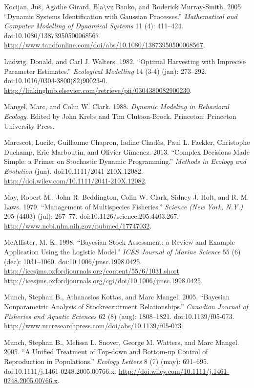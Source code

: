 \documentclass[author-year, review]{elsarticle} %
\begin{document}
Kocijan, Juš, Agathe Girard, Bla\textbackslash{}vz Banko, and Roderick
Murray-Smith. 2005. ``Dynamic Systems Identification with Gaussian
Processes.'' \emph{Mathematical and Computer Modelling of Dynamical
Systems} 11 (4): 411--424. doi:10.1080/13873950500068567.
\url{http://www.tandfonline.com/doi/abs/10.1080/13873950500068567}.

Ludwig, Donald, and Carl J. Walters. 1982. ``Optimal Harvesting with
Imprecise Parameter Estimates.'' \emph{Ecological Modelling} 14 (3-4)
(jan): 273--292. doi:10.1016/0304-3800(82)90023-0.
\url{http://linkinghub.elsevier.com/retrieve/pii/0304380082900230}.

Mangel, Marc, and Colin W. Clark. 1988. \emph{Dynamic Modeling in
Behavioral Ecology}. Edited by John Krebs and Tim Clutton-Brock.
Princeton: Princeton University Press.

Marescot, Lucile, Guillaume Chapron, Iadine Chadès, Paul L. Fackler,
Christophe Duchamp, Eric Marboutin, and Olivier Gimenez. 2013. ``Complex
Decisions Made Simple: a Primer on Stochastic Dynamic Programming.''
\emph{Methods in Ecology and Evolution} (jun).
doi:10.1111/2041-210X.12082.
\url{http://doi.wiley.com/10.1111/2041-210X.12082}.

May, Robert M., John R. Beddington, Colin W. Clark, Sidney J. Holt, and
R. M. Laws. 1979. ``Management of Multispecies Fisheries.''
\emph{Science (New York, N.Y.)} 205 (4403) (jul): 267--77.
doi:10.1126/science.205.4403.267.
\url{http://www.ncbi.nlm.nih.gov/pubmed/17747032}.

McAllister, M. K. 1998. ``Bayesian Stock Assessment: a Review and
Example Application Using the Logistic Model.'' \emph{ICES Journal of
Marine Science} 55 (6) (dec): 1031--1060. doi:10.1006/jmsc.1998.0425.
\href{http://icesjms.oxfordjournals.org/content/55/6/1031.short http://icesjms.oxfordjournals.org/cgi/doi/10.1006/jmsc.1998.0425}{http://icesjms.oxfordjournals.org/content/55/6/1031.short
http://icesjms.oxfordjournals.org/cgi/doi/10.1006/jmsc.1998.0425}.

Munch, Stephan B., Athanasios Kottas, and Marc Mangel. 2005. ``Bayesian
Nonparametric Analysis of Stockrecruitment Relationships.''
\emph{Canadian Journal of Fisheries and Aquatic Sciences} 62 (8) (aug):
1808--1821. doi:10.1139/f05-073.
\url{http://www.nrcresearchpress.com/doi/abs/10.1139/f05-073}.

Munch, Stephan B., Melissa L. Snover, George M. Watters, and Marc
Mangel. 2005. ``A Unified Treatment of Top-down and Bottom-up Control of
Reproduction in Populations.'' \emph{Ecology Letters} 8 (7) (may):
691--695. doi:10.1111/j.1461-0248.2005.00766.x.
\url{http://doi.wiley.com/10.1111/j.1461-0248.2005.00766.x}.
\end{document}
